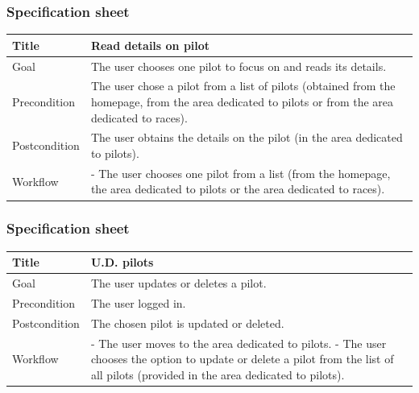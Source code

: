 \documentclass{beamer}
\begin{document}
\begin{frame}
    \frametitle{Specification sheet}
    \begin{table}
        \tiny
        \begin{tabular}{|p{2cm}|p{6cm}|}
        \hline  
        Title & \textbf{Read details on pilot} \\
        \hline
        Goal & The user chooses one pilot to focus on and reads its details. \\
        \hline
        Precondition & The user chose a pilot from a list of pilots (obtained from the homepage,
        from the area dedicated to pilots
        or from the area dedicated to races).\\
        \hline
        Postcondition & The user obtains the details on the pilot (in the area dedicated to pilots). \\
        \hline
        Workflow &
        - The user chooses one pilot from a list (from the homepage, the area dedicated to pilots or 
        the area dedicated to races). \\
        \hline
        \end{tabular}
\end{table}
\end{frame}

\begin{frame}
    \frametitle{Specification sheet}
    \begin{table}
        \tiny
        \begin{tabular}{|p{2cm}|p{6cm}|}
        \hline  
        Title & \textbf{U.D. pilots} \\
        \hline
        Goal & The user updates or deletes a pilot. \\
        \hline
        Precondition & The user logged in. \\
        \hline
        Postcondition & The chosen pilot is updated or deleted. \\
        \hline
        Workflow &
        - The user moves to the area dedicated to pilots. \newline
        - The user chooses the option to update or delete a pilot from 
        the list of all pilots (provided in the area dedicated to pilots). \\
        \hline
        \end{tabular}
\end{table}
\end{frame}
\end{document}
